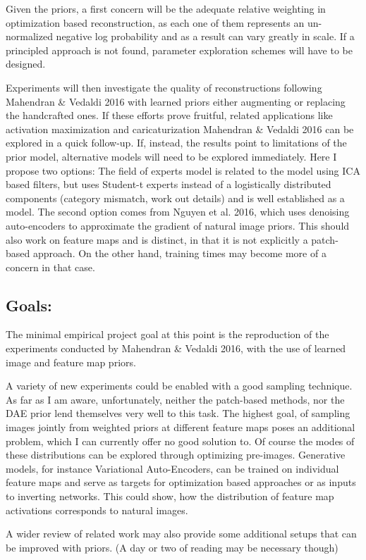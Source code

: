 \documentclass{article}
\begin{document}
Given the priors, a first concern will be the adequate relative weighting in optimization based reconstruction, as each one of them represents an un-normalized negative log probability and as a result can vary greatly in scale. If a principled approach is not found, parameter exploration schemes will have to be designed.

Experiments will then investigate the quality of reconstructions following Mahendran \& Vedaldi 2016 with learned priors either augmenting or replacing the handcrafted ones.
If these efforts prove fruitful, related applications like activation maximization and caricaturization Mahendran \& Vedaldi 2016 can be explored in a quick follow-up. If, instead, the results point to limitations of the prior model, alternative models will need to be explored immediately. Here I propose two options: The field of experts model is related to the model using ICA based filters, but uses Student-t experts instead of a logistically distributed components (category mismatch, work out details) and is well established as a model. The second option comes from Nguyen et al. 2016, which uses denoising auto-encoders to approximate the gradient of natural image priors. This should also work on feature maps and is distinct, in that it is not explicitly a patch-based approach. On the other hand, training times may become more of a concern in that case.

\subsection{Goals:}

The minimal empirical project goal at this point is the reproduction of the experiments conducted by Mahendran \& Vedaldi 2016, with the use of learned image and feature map priors.

A variety of new experiments could be enabled with a good sampling technique. As far as I am aware, unfortunately, neither the patch-based methods, nor the DAE prior lend themselves very well to this task. The highest goal, of sampling images jointly from weighted priors at different feature maps poses an additional problem, which I can currently offer no good solution to. Of course the modes of these distributions can be explored through optimizing pre-images. 
Generative models, for instance Variational Auto-Encoders, can be trained on individual feature maps and serve as targets for optimization based approaches or as inputs to inverting networks. This could show, how the distribution of feature map activations corresponds to natural images.

A wider review of related work may also provide some additional setups that can be improved with priors. (A day or two of reading may be necessary though)
\end{document}
